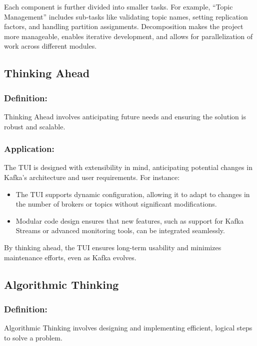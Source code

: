 \documentclass[10pt , a4paper]{report}
\begin{document}
Each component is further divided into smaller tasks. For example, ``Topic Management'' includes sub-tasks like validating topic names, setting replication factors, and handling partition assignments. Decomposition makes the project more manageable, enables iterative development, and allows for parallelization of work across different modules.

\subsection{Thinking Ahead}

\subsubsection*{Definition:}  
Thinking Ahead involves anticipating future needs and ensuring the solution is robust and scalable.

\subsubsection*{Application:}  
The TUI is designed with extensibility in mind, anticipating potential changes in Kafka’s architecture and user requirements. For instance:
\begin{itemize}
    \item The TUI supports dynamic configuration, allowing it to adapt to changes in the number of brokers or topics without significant modifications.
    \item Modular code design ensures that new features, such as support for Kafka Streams or advanced monitoring tools, can be integrated seamlessly.
\end{itemize}

By thinking ahead, the TUI ensures long-term usability and minimizes maintenance efforts, even as Kafka evolves.

\subsection{Algorithmic Thinking}

\subsubsection*{Definition:}  
Algorithmic Thinking involves designing and implementing efficient, logical steps to solve a problem.
\end{document}
